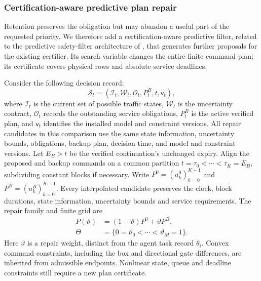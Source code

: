 \documentclass[journal,10pt]{IEEEtran}
\begin{document}
\subsubsection{Certification-aware predictive plan repair}
\label{sec:predictive-repair}

Retention preserves the obligation but may abandon a useful part of the
requested priority. We therefore add a certification-aware predictive filter, related
to the predictive safety-filter architecture of \cite{wabersich2021}, that
generates further proposals for the existing certifier. Its search variable
changes the entire finite command plan; its certificate covers physical rows
and absolute service deadlines.

Consider the following decision record:
\[
\mathcal S_t=(\mathcal I_t,\mathcal W_t,\mathcal O_t,P_t^B,t,\mathsf v_t),
\]
where $\mathcal I_t$ is the current set of possible traffic states,
$\mathcal W_t$ is the uncertainty contract, $\mathcal O_t$ records the
outstanding service obligations, $P_t^B$ is the active verified plan,
and $\mathsf v_t$ identifies the installed model and constraint versions.
All repair candidates in this comparison use the same state information,
uncertainty bounds, obligations, backup plan, decision time, and model and
constraint versions. Let $E_B>t$ be the verified continuation's unchanged
expiry. Align the proposed and backup commands on a common
partition $t=\tau_0<\cdots<\tau_K=E_B$, subdividing constant blocks if
necessary. Write $P^0=(u_k^0)_{k=0}^{K-1}$ and
$P^B=(u_k^B)_{k=0}^{K-1}$. Every interpolated candidate preserves the
clock, block durations, state information, uncertainty bounds and service
requirements.
The repair family and finite grid are
\begin{equation}
\begin{aligned}
P(\vartheta)&=(1-\vartheta)P^0+\vartheta P^B,\\
\Theta&=\{0=\vartheta_0<\cdots<\vartheta_M=1\}.
\end{aligned}
\label{eq:repair-family}
\end{equation}
Here $\vartheta$ is a repair weight, distinct from the agent task record
$\theta_i$. Convex command constraints, including the box and directional
gate differences, are inherited from admissible endpoints. Nonlinear state,
queue and deadline constraints still require a new plan certificate.
\end{document}
